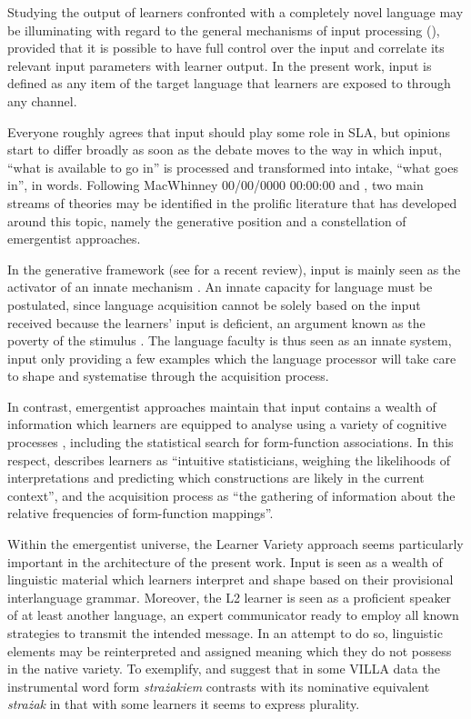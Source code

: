 Studying the output of learners confronted with a completely novel language may be illuminating with regard to the general mechanisms of input processing (\citealt{RastEtAl2001, Perdue2002}), provided that it is possible to have full control over the input and correlate its relevant input parameters with learner output. In the present work, input is defined as any item of the target language that learners are exposed to through any channel.

Everyone roughly agrees that input should play some role in SLA, but opinions start to differ broadly as soon as the debate moves to the way in which input, “what is available to go in” is processed and transformed into intake, “what goes in”, in  words. Following MacWhinney 00/00/0000 00:00:00 and \citet{Hulstijn2015}, two main streams of theories may be identified in the prolific literature that has developed around this topic, namely the generative position and a constellation of emergentist approaches.

In the generative framework (see \citealt{RankinUnsworth2016} for a recent review), input is mainly seen as the activator of an innate mechanism \citep{Chomsky1981}. An innate capacity for language must be postulated, since language acquisition cannot be solely based on the input received because the learners’ input is deficient, an argument known as the poverty of the stimulus \citep{Chomsky1980}. The language faculty is thus seen as an innate system, input only providing a few examples which the language processor will take care to shape and systematise through the acquisition process.

In contrast, emergentist approaches maintain that input contains a wealth of information which learners are equipped to analyse using a variety of cognitive processes \citep{Tomasello2005}, including the statistical search for form-function associations. In this respect, \citet[1]{Ellis2006b} describes learners as “intuitive statisticians, weighing the likelihoods of interpretations and predicting which constructions are likely in the current context”, and the acquisition process as “the gathering of information about the relative frequencies of form-function mappings”. 

Within the emergentist universe, the Learner Variety approach seems particularly important in the architecture of the present work. Input is seen as a wealth of linguistic material which learners interpret and shape based on their provisional interlanguage grammar. Moreover, the L2 learner is seen as a proficient speaker of at least another language, an expert communicator ready to employ all known strategies to transmit the intended message. In an attempt to do so, linguistic elements may be reinterpreted and assigned meaning which they do not possess in the native variety. To exemplify, \citet{Bernini2018} and \citet[28--33]{Dimroth2018} suggest that in some VILLA data the instrumental word form \textit{strażakiem} contrasts with its nominative equivalent \textit{strażak} in that with some learners it seems to express plurality.

